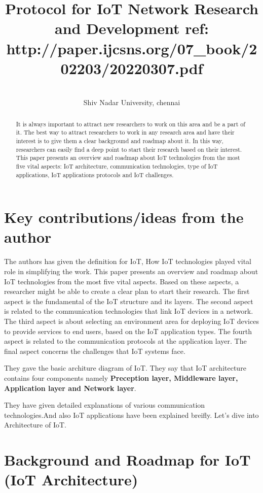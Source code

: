 \documentclass[pmlr,twocolumn,10pt]{jmlr} %
\title[Short Title]{  Protocol for IoT Network Research and Development \titlebreak ref: http://paper.ijcsns.org/07_book/202203/20220307.pdf}
\author{%
\Name{Bagiya Lakshmi S} \Email{bagiyalakshmi59@gmail.com}\\
\addr Shiv Nadar University, chennai
}
\begin{document}
\maketitle

\begin{abstract}
It is always 
important to attract new researchers to work on this area and be a 
part of it. The best way to attract researchers to work in any 
research area and have their interest is to give them a clear 
background and roadmap about it. In this way, researchers can 
easily find a deep point to start their research based on their interest. 
This paper presents an overview and roadmap about IoT 
technologies from the most five vital aspects: IoT architecture, 
communication technologies, type of IoT applications, IoT 
applications protocols and IoT challenges. 

\end{abstract}

\section*{Key contributions/ideas from the author}
The authors has given the definition for IoT, How IoT technologies played vital role in simplifying the work.  This paper presents an 
overview and roadmap about IoT technologies from the 
most five vital aspects. Based on these aspects, a researcher 
might be able to create a clear plan to start their research. 
The first aspect is the fundamental of the IoT structure and 
its layers. The second aspect is related to the 
communication technologies that link IoT devices in a 
network. The third aspect is about selecting an environment 
area for deploying IoT devices to provide services to endusers, based on the IoT application types. The fourth aspect 
is related to the communication protocols at the application 
layer. The final aspect concerns the challenges that IoT 
systems face. 

They gave the basic architure diagram of IoT. They say that IoT architecture contains four components namely \textbf{Preception layer, Middleware layer, Application layer and Network layer}.

They have given detailed explanations of various communication technologies.And also IoT applications have been explained breifly. Let's dive into Architecture of IoT.

\section{Background and Roadmap for IoT (IoT 
Architecture)}
\label{sec:intro}
\end{document}

